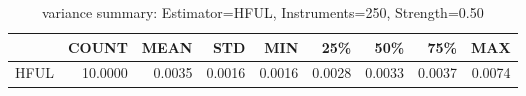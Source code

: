 \begin{table}[ht]
\centering
\caption{variance summary: Estimator=HFUL, Instruments=250, Strength=0.50}
\begin{tabular}{lrrrrrrrr}
\toprule
 & COUNT & MEAN & STD & MIN & 25\% & 50\% & 75\% & MAX \\
\midrule
HFUL & 10.0000 & 0.0035 & 0.0016 & 0.0016 & 0.0028 & 0.0033 & 0.0037 & 0.0074 \\
\bottomrule
\end{tabular}
\end{table}
